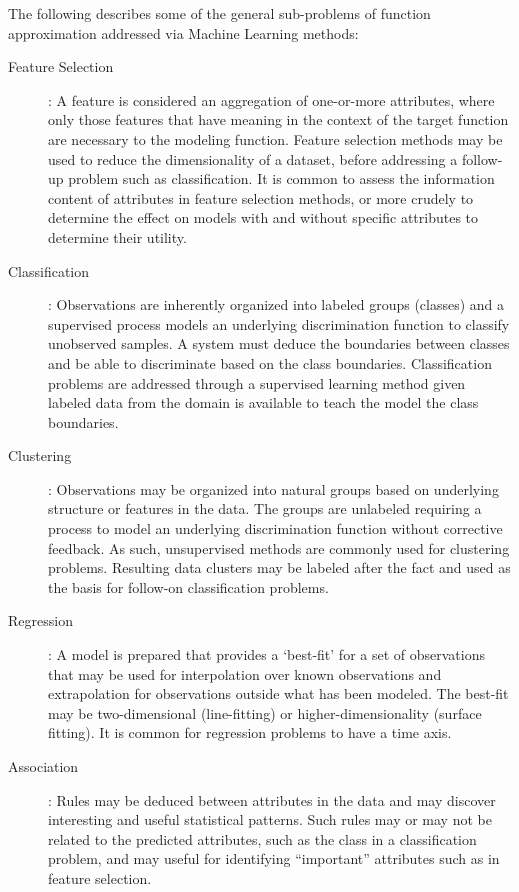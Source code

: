 \documentclass[a4paper, 11pt]{article}
\begin{document}
The following describes some of the general sub-problems of function approximation addressed via Machine Learning methods:

\begin{description}
	\item[Feature Selection]: A feature is considered an aggregation of one-or-more attributes, where only those features that have meaning in the context of the target function are necessary to the modeling function. Feature selection methods may be used to reduce the dimensionality of a dataset, before addressing a follow-up problem such as classification. It is common to assess the information content of attributes in feature selection methods, or more crudely to determine the effect on models with and without specific attributes to determine their utility.
	
	\item[Classification]: Observations are inherently organized into labeled groups (classes) and a supervised process models an underlying discrimination function to classify unobserved samples. A system must deduce the boundaries between classes and be able to discriminate based on the class boundaries. Classification problems are addressed through a supervised learning method given labeled data from the domain is available to teach the model the class boundaries. 
	
	\item[Clustering]: Observations may be organized into natural groups based on underlying structure or features in the data. The groups are unlabeled requiring a process to model an underlying discrimination function without corrective feedback. As such, unsupervised methods are commonly used for clustering problems. Resulting data clusters may be labeled after the fact and used as the basis for follow-on classification problems.
	
	\item[Regression]: A model is prepared that provides a `best-fit' for a set of observations that may be used for interpolation over known observations and extrapolation for observations outside what has been modeled. The best-fit may be two-dimensional (line-fitting) or higher-dimensionality (surface fitting). It is common for regression problems to have a time axis.
	
	\item[Association]: Rules may be deduced between attributes in the data and may discover interesting and useful statistical patterns. Such rules may or may not be related to the predicted attributes, such as the class in a classification problem, and may useful for identifying ``important'' attributes such as in feature selection.
		
\end{description}
\end{document}
